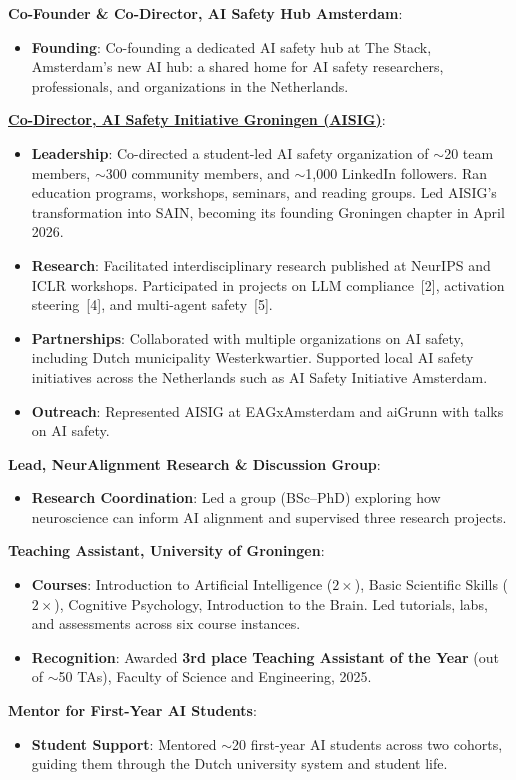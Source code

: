 \documentclass[a4paper,10pt]{article}
\newcommand{\resumeItem}[2]{
  \item\small{
    \textbf{#1}{: #2 \vspace{-2pt}}
  }
}
\newcommand{\resumeSubItem}[2]{\resumeItem{#1}{#2}\vspace{-3pt}}
\newcommand{\resumeItemListStart}{\begin{itemize}}
\newcommand{\resumeItemListEnd}{\end{itemize}\vspace{-5pt}}
\begin{document}
\resumeSubItem{Co-Founder \& Co-Director, AI Safety Hub Amsterdam} \hfill{2026 -- Ongoing}
\resumeItemListStart
  \resumeItem{Founding}{Co-founding a dedicated AI safety hub at The Stack, Amsterdam's new AI hub: a shared home for AI safety researchers, professionals, and organizations in the Netherlands.}
\resumeItemListEnd

\resumeSubItem{\href{https://safeainetherlands.org/chapters/groningen}{Co-Director, AI Safety Initiative Groningen (AISIG)}} \hfill{Aug.\ 2025 -- Apr.\ 2026}
\resumeItemListStart
  \resumeItem{Leadership}{Co-directed a student-led AI safety organization of $\sim$20 team members, $\sim$300 community members, and $\sim$1,000 LinkedIn followers. Ran education programs, workshops, seminars, and reading groups. Led AISIG's transformation into SAIN, becoming its founding Groningen chapter in April 2026.}
  \resumeItem{Research}{Facilitated interdisciplinary research published at NeurIPS and ICLR workshops. Participated in projects on LLM compliance~[2], activation steering~[4], and multi-agent safety~[5].}
  \resumeItem{Partnerships}{Collaborated with multiple organizations on AI safety, including Dutch municipality Westerkwartier. Supported local AI safety initiatives across the Netherlands such as AI Safety Initiative Amsterdam.}
  \resumeItem{Outreach}{Represented AISIG at EAGxAmsterdam and aiGrunn with talks on AI safety.}
\resumeItemListEnd

\resumeSubItem{Lead, NeurAlignment Research \& Discussion Group} \hfill{Nov.\ 2024 -- Nov.\ 2025}
\resumeItemListStart
  \resumeItem{Research Coordination}{Led a group (BSc--PhD) exploring how neuroscience can inform AI alignment and supervised three research projects.}
\resumeItemListEnd

\resumeSubItem{Teaching Assistant, University of Groningen} \hfill{Sep.\ 2023 -- Feb.\ 2025}
\resumeItemListStart
  \resumeItem{Courses}{Introduction to Artificial Intelligence ($2\times$), Basic Scientific Skills ($2\times$), Cognitive Psychology, Introduction to the Brain. Led tutorials, labs, and assessments across six course instances.}
  \resumeItem{Recognition}{Awarded \textbf{3rd place Teaching Assistant of the Year} (out of $\sim$50 TAs), Faculty of Science and Engineering, 2025.}
\resumeItemListEnd

\resumeSubItem{Mentor for First-Year AI Students} \hfill{Sep.\ 2023 -- Feb.\ 2024; Sep.\ 2024 -- Feb.\ 2025}
\resumeItemListStart
  \resumeItem{Student Support}{Mentored $\sim$20 first-year AI students across two cohorts, guiding them through the Dutch university system and student life.}
\resumeItemListEnd
\end{document}
